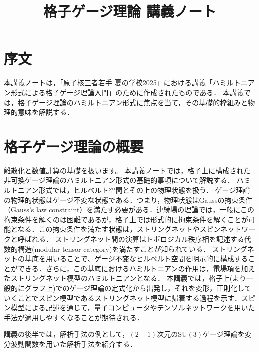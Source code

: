 \documentclass[
  letterpaper,
]{book}
\title{格子ゲージ理論 講義ノート}
\author{}
\date{}
\renewcommand*\contentsname{Table of contents}
\newcommand\contentsname{Table of contents}
\begin{document}
\frontmatter
\maketitle

\renewcommand*\contentsname{Table of contents}
{
\setcounter{tocdepth}{2}
\tableofcontents
}

\mainmatter
{}

\chapter{序文}\label{ux5e8fux6587}

本講義ノートは，「原子核三者若手
夏の学校2025」における講義「ハミルトニアン形式による格子ゲージ理論入門」のために作成されたものである．
本講義では，格子ゲージ理論のハミルトニアン形式に焦点を当て，その基礎的枠組みと物理的意味を解説する．


\chapter{格子ゲージ理論の概要}\label{ux683cux5b50ux30b2ux30fcux30b8ux7406ux8ad6ux306eux6982ux8981}

離散化と数値計算の基礎を扱います。
本講義ノートでは，格子上に構成された非可換ゲージ理論のハミルトニアン形式の基礎的事項について解説する．
ハミルトニアン形式では，ヒルベルト空間とその上の物理状態を扱う．
ゲージ理論の物理的状態はゲージ不変な状態である．つまり，物理状態はGaussの拘束条件（Gauss's
law
constraint）を満たす必要がある．連続場の理論では，一般にこの拘束条件を解くのは困難であるが，格子上では形式的に拘束条件を解くことが可能となる．この拘束条件を満たす状態は，ストリングネットやスピンネットワークと呼ばれる．
ストリングネット間の演算はトポロジカル秩序相を記述する代数的構造(modular
tensor category)を満たすことが知られている．
ストリングネットの基底を用いることで、ゲージ不変なヒルベルト空間を明示的に構成することができる．さらに，この基底におけるハミルトニアンの作用は，電場項を加えたストリングネット模型のハミルトニアンとなる．
本講義では，格子上(より一般的にグラフ上)でのゲージ理論の定式化から出発し，それを変形，正則化していくことでスピン模型であるストリングネット模型に帰着する過程を示す．スピン模型による記述を通じて，量子コンピュータやテンソルネットワークを用いた手法が適用しやすくなることが期待される．

講義の後半では，解析手法の例として，\((2+1)\)次元の\(\mathrm{SU}(3)\)ゲージ理論を変分波動関数を用いた解析手法を紹介する．
\end{document}
